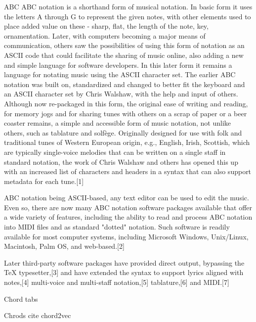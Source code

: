 ABC \cite{Sturm2015}
ABC notation is a shorthand form of musical notation. In basic form it uses the letters A through G to represent the given notes, with other elements used to place added value on these - sharp, flat, the length of the note, key, ornamentation. Later, with computers becoming a major means of communication, others saw the possibilities of using this form of notation as an ASCII code that could facilitate the sharing of music online, also adding a new and simple language for software developers. In this later form it remains a language for notating music using the ASCII character set. The earlier ABC notation was built on, standardized and changed to better fit the keyboard and an ASCII character set by Chris Walshaw, with the help and input of others. Although now re-packaged in this form, the original ease of writing and reading, for memory jogs and for sharing tunes with others on a scrap of paper or a beer coaster remains, a simple and accessible form of music notation, not unlike others, such as tablature and solfège. Originally designed for use with folk and traditional tunes of Western European origin, e.g., English, Irish, Scottish, which are typically single-voice melodies that can be written on a single staff in standard notation, the work of Chris Walshaw and others has opened this up with an increased list of characters and headers in a syntax that can also support metadata for each tune.[1]

ABC notation being ASCII-based, any text editor can be used to edit the music. Even so, there are now many ABC notation software packages available that offer a wide variety of features, including the ability to read and process ABC notation into MIDI files and as standard "dotted" notation. Such software is readily available for most computer systems, including Microsoft Windows, Unix/Linux, Macintosh, Palm OS, and web-based.[2]

Later third-party software packages have provided direct output, bypassing the TeX typesetter,[3] and have extended the syntax to support lyrics aligned with notes,[4] multi-voice and multi-staff notation,[5] tablature,[6] and MIDI.[7]


Chord tabs

Chrods cite chord2vec

